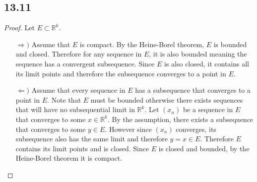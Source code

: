 \documentclass[12pt,titlepage]{extarticle}
\begin{document}
\subsection*{13.11}
\begin{proof}
    Let $E \subset \mathbb{R}^k$.
    \begin{enumerate}
        \item[$\Rightarrow)$]
            Assume that $E$ is compact. By the Heine-Borel theorem, $E$ is bounded and closed. Therefore for any sequence in $E$, it is also bounded meaning the sequence has a convergent subsequence. Since $E$ is also closed, it contains all its limit points and therefore the subsequence converges to a point in $E$.
        \item[$\Leftarrow)$]
            Assume that every sequence in $E$ has a subsequence that converges to a point in $E$. Note that $E$ must be bounded otherwise there exists sequences that will have no subsequential limit in $\mathbb{R}^k$. Let $(x_n)$ be a sequence in $E$ that converges to some $x \in \mathbb{R}^k$. By the assumption, there exists a subsequence that converges to some $y \in E$. However since $(x_n)$ converges, its subsequence also has the same limit and therefore $y = x \in E$. Therefore $E$ contains its limit points and is closed. Since $E$ is closed and bounded, by the Heine-Borel theorem it is compact.
    \end{enumerate}
\end{proof}
\end{document}
